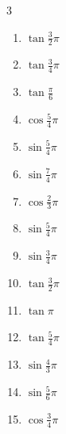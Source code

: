 \begin{multicols}{3}
\begin{enumerate}
  \item $\displaystyle \tan{\frac{3}{2}\pi}$
        \phantom{$\displaystyle \quad なし$}

  \item $\displaystyle \tan{\frac{3}{4}\pi}$
        \phantom{$\displaystyle =-1$}

\columnbreak %

  \item $\displaystyle \tan{\frac{\pi}{6}}$

  \item $\displaystyle \cos{\frac{5}{4}\pi}$

  \item $\displaystyle \sin{\frac{5}{4}\pi}$

  \item $\displaystyle \sin{\frac{7}{4}\pi}$

  \item $\displaystyle \cos{\frac{2}{3}\pi}$

  \item $\displaystyle \sin{\frac{5}{4}\pi}$

  \item $\displaystyle \sin{\frac{3}{4}\pi}$

  \item $\displaystyle \tan{\frac{3}{2}\pi}$
        \phantom{$\displaystyle \quad なし$}

  \item $\displaystyle \tan{\pi}$
        \phantom{$\displaystyle =0$}

  \item $\displaystyle \tan{\frac{5}{4}\pi}$
        \phantom{$\displaystyle =1$}

  \item $\displaystyle \sin{\frac{4}{3}\pi}$

  \item $\displaystyle \sin{\frac{5}{6}\pi}$

  \item $\displaystyle \cos{\frac{3}{4}\pi}$


\end{enumerate}
\end{multicols}
